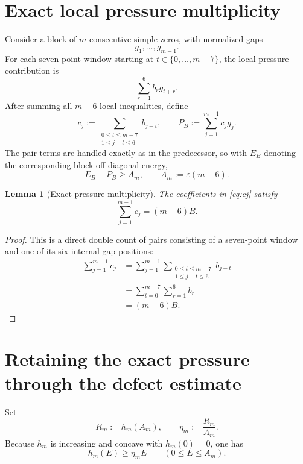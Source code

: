 \documentclass[11pt]{article}
\newtheorem{lemma}[theorem]{Lemma}
\theoremstyle{remark}
\newcommand{\eps}{\varepsilon}
\begin{document}
\section{Exact local pressure multiplicity}

Consider a block of $m$ consecutive simple zeros, with normalized gaps
\[
g_1,\ldots,g_{m-1}.
\]
For each seven-point window starting at $t\in\{0,\ldots,m-7\}$, the local pressure contribution is
\[
\sum_{r=1}^{6} b_r g_{t+r}.
\]
After summing all $m-6$ local inequalities, define
\begin{equation}\label{eq:cj}
c_j:=\sum_{\substack{0\le t\le m-7\\1\le j-t\le 6}} b_{j-t},
\qquad
P_B:=\sum_{j=1}^{m-1}c_jg_j.
\end{equation}
The pair terms are handled exactly as in the predecessor, so with $E_B$ denoting the corresponding block off-diagonal energy,
\begin{equation}\label{eq:local-energy}
E_B+P_B\ge A_m,
\qquad
A_m:=\eps(m-6).
\end{equation}

\begin{lemma}[Exact pressure multiplicity]\label{lem:pressure}
The coefficients in \eqref{eq:cj} satisfy
\[
\sum_{j=1}^{m-1}c_j=(m-6)B.
\]
\end{lemma}

\begin{proof}
This is a direct double count of pairs consisting of a seven-point window and one of its six internal gap positions:
\begin{align*}
\sum_{j=1}^{m-1}c_j
&=\sum_{j=1}^{m-1}
  \sum_{\substack{0\le t\le m-7\\1\le j-t\le6}}b_{j-t}\\
&=\sum_{t=0}^{m-7}\sum_{r=1}^{6}b_r\\
&=(m-6)B.
\end{align*}
\end{proof}

\section{Retaining the exact pressure through the defect estimate}

Set
\[
R_m:=h_m(A_m),\qquad \eta_m:=\frac{R_m}{A_m}.
\]
Because $h_m$ is increasing and concave with $h_m(0)=0$, one has
\begin{equation}\label{eq:chord}
h_m(E)\ge \eta_m E\qquad(0\le E\le A_m).
\end{equation}
\end{document}
